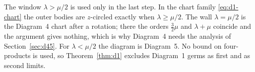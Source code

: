 \begin{remark}\label{rem:d1-wall}
The window $\lambda>\mu/2$ is used only in the last step.  In the chart family
\eqref{eq:d1-chart} the outer bodies are $z$-circled exactly when $\lambda\ge\mu/2$.  The wall
$\lambda=\mu/2$ is the Diagram~4 chart after a rotation; there the orders $\frac32\mu$ and
$\lambda+\mu$ coincide and the argument gives nothing, which is why Diagram~4 needs the analysis
of Section~\ref{sec:d45}.  For $\lambda<\mu/2$ the diagram is Diagram~5.  No bound on
four-products is used, so Theorem~\ref{thm:d1} excludes Diagram~1 germs as first and as second
limits.
\end{remark}
